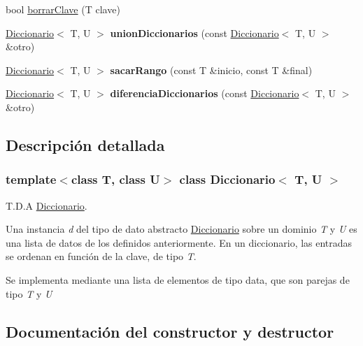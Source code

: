 \begin{DoxyCompactItemize}
bool \hyperlink{classDiccionario_ab4c7aabdad91cf517db259a371984cdf}{borrar\+Clave} (T clave)
\item 
\mbox{\label{classDiccionario_afa915dec9a281340b8de575026131e7f}} 
\hyperlink{classDiccionario}{Diccionario}$<$ T, U $>$ {\bfseries union\+Diccionarios} (const \hyperlink{classDiccionario}{Diccionario}$<$ T, U $>$ \&otro)
\item 
\mbox{\label{classDiccionario_a13c55d999b1bcc0a0319659f5bc5dba4}} 
\hyperlink{classDiccionario}{Diccionario}$<$ T, U $>$ {\bfseries sacar\+Rango} (const T \&inicio, const T \&final)
\item 
\mbox{\label{classDiccionario_aeb9185c8e3f815b19c4f6b1811587787}} 
\hyperlink{classDiccionario}{Diccionario}$<$ T, U $>$ {\bfseries diferencia\+Diccionarios} (const \hyperlink{classDiccionario}{Diccionario}$<$ T, U $>$ \&otro)
\end{DoxyCompactItemize}


\subsection{Descripción detallada}
\subsubsection*{template$<$class T, class U$>$\newline
class Diccionario$<$ T, U $>$}

T.\+D.\+A \hyperlink{classDiccionario}{Diccionario}. 

Una instancia {\itshape d} del tipo de dato abstracto \hyperlink{classDiccionario}{Diccionario} sobre un dominio {\itshape T} y {\itshape U} es una lista de datos de los definidos anteriormente. En un diccionario, las entradas se ordenan en función de la clave, de tipo {\itshape T}.

Se implementa mediante una lista de elementos de tipo data, que son parejas de tipo {\itshape T} y {\itshape U} 

\subsection{Documentación del constructor y destructor}
\mbox{\label{classDiccionario_adad32f7bfd34b7a8631ff5f26033b369}} 
